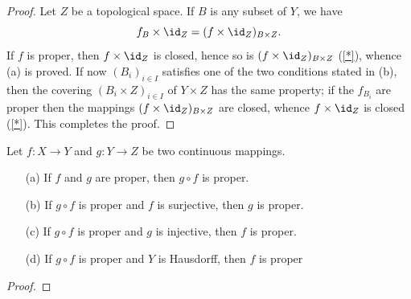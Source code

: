 \begin{proof}
Let $Z$ be a topological space. If $B$ is any subset of $Y$, we have
\[f_B\times\id_Z=(f\times\id_Z)_{B\times Z}.\]
If $f$ is proper, then $f\times\id_Z$ is closed, hence so is $(f\times\id_Z)_{B\times Z}$ (\cref{*}), whence (a) is proved. If now $(B_i)_{i\in I}$ satisfies one of the two conditions stated in (b), then the covering $(B_i\times Z)_{i\in I}$ of $Y\times Z$ has the same property; if the $f_{B_i}$ are proper then the mappings $(f\times\id_Z)_{B\times Z}$ are closed, whence $f\times\id_Z$ is closed (\cref{*}). This completes the proof.
\end{proof}
\begin{proposition}
Let $f:X\to Y$ and $g:Y\to Z$ be two continuous mappings.
\begin{itemize}
\item[(a)] If $f$ and $g$ are proper, then $g\circ f$ is proper.
\item[(b)] If $g\circ f$ is proper and $f$ is surjective, then $g$ is proper.
\item[(c)] If $g\circ f$ is proper and $g$ is injective, then $f$ is proper. 
\item[(d)] If $g\circ f$ is proper and $Y$ is Hausdorff, then $f$ is proper   
\end{itemize}
\end{proposition}
\begin{proof}

\end{proof}
